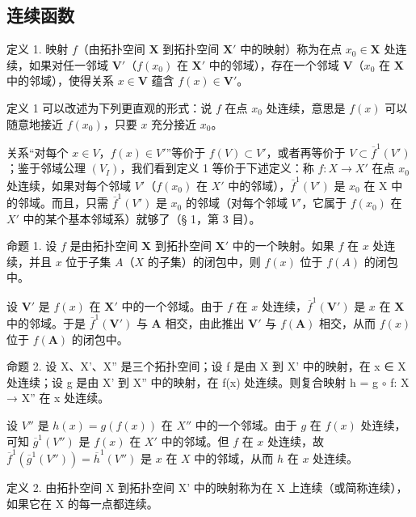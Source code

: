 \subsection{连续函数}

定义 1. 映射 \(f\)（由拓扑空间 \(\mathbf{X}\) 到拓扑空间 \(\mathbf{X}'\) 中的映射）称为在点 \(x_0 \in \mathbf{X}\) 处连续，如果对任一邻域 \(\mathbf{V}'\)（\(f(x_0)\) 在 \(\mathbf{X}'\) 中的邻域），存在一个邻域 \(\mathbf{V}\)（\(x_0\) 在 \(\mathbf{X}\) 中的邻域），使得关系 \(x \in \mathbf{V}\) 蕴含 \(f(x) \in \mathbf{V}'\)。

定义 1 可以改述为下列更直观的形式：说 \(f\) 在点 \(x_0\) 处连续，意思是 \(f(x)\) 可以随意地接近 \(f(x_0)\)，只要 \(x\) 充分接近 \(x_0\)。

关系“对每个 \(x \in V\)，\(f(x) \in V'\)”等价于 \(f(V) \subset V'\)，或者再等价于 \(V \subset \overline{f}^{1}(V')\)；鉴于邻域公理 \((V_{I})\)，我们看到定义 1 等价于下述定义：称 \(f: X \to X'\) 在点 \(x_{0}\) 处连续，如果对每个邻域 \(V'\)（\(f(x_{0})\) 在 \(X'\) 中的邻域），\(\overline{f}^{1}(V')\) 是 \(x_{0}\) 在 X 中的邻域。而且，只需 \(\overline{f}^{1}(V')\) 是 \(x_{0}\) 的邻域（对每个邻域 \(V'\)，它属于 \(f(x_{0})\) 在 \(X'\) 中的某个基本邻域系）就够了（§ 1，第 3 目）。

命题 1. 设 \(f\) 是由拓扑空间 \(\mathbf{X}\) 到拓扑空间 \(\mathbf{X}'\) 中的一个映射。如果 \(f\) 在 \(x\) 处连续，并且 \(x\) 位于子集 \(A\)（\(X\) 的子集）的闭包中，则 \(f(x)\) 位于 \(f(A)\) 的闭包中。

设 \(\mathbf{V}'\) 是 \(f(x)\) 在 \(\mathbf{X}'\) 中的一个邻域。由于 \(f\) 在 \(x\) 处连续，\(\overline{f}^1 (\mathbf{V}')\) 是 \(x\) 在 \(\mathbf{X}\) 中的邻域。于是 \(\overline{f}^1 (\mathbf{V}')\) 与 \(\mathbf{A}\) 相交，由此推出 \(\mathbf{V}'\) 与 \(f(\mathbf{A})\) 相交，从而 \(f(x)\) 位于 \(f(\mathbf{A})\) 的闭包中。

命题 2. 设 X、X'、X'' 是三个拓扑空间；设 f 是由 X 到 X' 中的映射，在 x ∈ X 处连续；设 g 是由 X' 到 X'' 中的映射，在 f(x) 处连续。则复合映射 h = g \(\circ\) f: X → X'' 在 x 处连续。

设 \(V''\) 是 \(h(x) = g(f(x))\) 在 \(X''\) 中的一个邻域。由于 \(g\) 在 \(f(x)\) 处连续，可知 \(\overline{g}^1(V'')\) 是 \(f(x)\) 在 \(X'\) 中的邻域。但 \(f\) 在 \(x\) 处连续，故 \(\overline{f}^1(\overline{g}^1(V'')) = \overline{h}^1(V'')\) 是 \(x\) 在 \(X\) 中的邻域，从而 \(h\) 在 \(x\) 处连续。

定义 2. 由拓扑空间 X 到拓扑空间 X' 中的映射称为在 X 上连续（或简称连续），如果它在 X 的每一点都连续。

